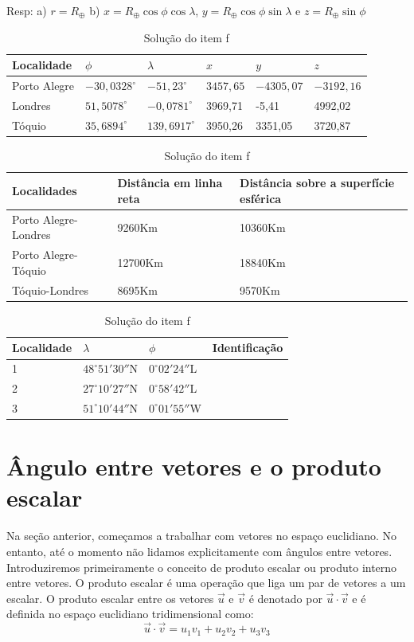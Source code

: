 \begin{table}[h]
Resp: a) $r=R_\oplus$ b)
 $x=R_\oplus \cos\phi \cos\lambda$, $y=R_\oplus \cos\phi\sin\lambda$ e $z=R_\oplus \sin\phi$
	\centering
		\begin{tabular}{|l|l|l|l|l|l|}
		\hline
	  Localidade & $\phi$ & $\lambda$ & $x$ & $y$ & $z$\\ 
		\hline
		Porto Alegre & $-30,0328^\circ$ & $-51,23^\circ$& $3457,65$&$-4305,07$& $-3192,16$\\ 		
  	\hline
		Londres & $51,5078^\circ$ & $-0,0781^\circ$&3969,71&-5,41&4992,02\\ 		
  	\hline
  	Tóquio & $35,6894^\circ$ & $139,6917^\circ$&3950,26&3351,05&3720,87\\ 		
  	\hline	
		\end{tabular}
	\caption{Coordenadas geográficas  e cartesianas de algumas cidades - solução do item d.}
\vspace{10pt}
		\begin{tabular}{|l|l|l|}
		\hline
	  Localidades & Distância em linha reta & Distância sobre a superfície esférica \\ 
		\hline
		Porto Alegre-Londres & 9260Km & 10360Km\\ 		
  	\hline
  	Porto Alegre-Tóquio & 12700Km&18840Km\\ 		
  	\hline
		Tóquio-Londres &8695Km &9570Km\\ 		
  	\hline		
		\end{tabular}
	\caption{Distância entre as cidades - solução do item e.}

\vspace{10pt}	
		\begin{tabular}{|l|l|l|l|}
		\hline
Localidade &	  $\lambda$ & $\phi$& Identificação\\ 
		\hline
1&		$48^\circ 51{'}30{''}$N &	$0^\circ 02{'}24{''}$L & \\
	\hline
2&	  $27^\circ 10{'}27{''}$N & 	$0^\circ 58{'}42{''}$L & \\
	\hline
3&	  $51^\circ 10{'}44{''}$N & $0^\circ 01{'}55{''}$W&  \\
		\hline		
		\end{tabular}
	\caption{Solução do item f}
\end{table}


\section{Ângulo entre vetores e o produto escalar}
Na seção anterior, começamos a trabalhar com vetores no espaço euclidiano. No entanto, até o momento não lidamos explicitamente com ângulos entre vetores. Introduziremos primeiramente o conceito de produto escalar ou produto interno entre vetores. O produto escalar é uma operação que liga um par de vetores a um escalar. O produto escalar entre os vetores $\vec{u}$ e $\vec{v}$  é denotado por $\vec{u}\cdot \vec{v}$ e é definida no espaço euclidiano tridimensional como:
\begin{equation}\label{defprodesc}\vec{u}\cdot\vec{v}=u_1v_1+u_2v_2+u_3v_3\end{equation}


